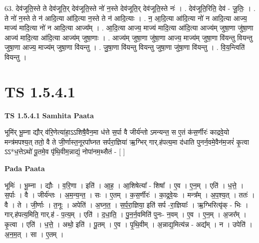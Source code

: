 \documentclass[17pt]{extarticle}
\begin{document}
63. देव॑जूति॒स्ते ते देव॑जूति॒र् देव॑जूति॒स्ते नो॑ न॒स्ते देव॑जूति॒र् देव॑जूति॒स्ते नः॑ । . देव॑जूति॒रिति॒ देव॑ - जू॒तिः॒ । . ते नो॑ न॒स्ते ते न॑ आदि॒त्या आ॑दि॒त्या न॒स्ते ते न॑ आदि॒त्याः । . न॒ आ॒दि॒त्या आ॑दि॒त्या नो॑ न आदि॒त्या आज्य॒ माज्य॑ मादि॒त्या नो॑ न आदि॒त्या आज्य᳚म् । . आ॒दि॒त्या आज्य॒ माज्य॑ मादि॒त्या आ॑दि॒त्या आज्य॑म् जुषा॒णा जु॑षा॒णा आज्य॑ मादि॒त्या आ॑दि॒त्या आज्य॑म् जुषा॒णाः । . आज्य॑म् जुषा॒णा जु॑षा॒णा आज्य॒ माज्य॑म् जुषा॒णा वि॑यन्तु वियन्तु जुषा॒णा आज्य॒ माज्य॑म् जुषा॒णा वि॑यन्तु । . जु॒षा॒णा वि॑यन्तु वियन्तु जुषा॒णा जु॑षा॒णा वि॑यन्तु । . वि॒य॒न्त्विति॑ वियन्तु । \newline
\pagebreak
{}

\section{ TS 1.5.4.1 }

\textbf{TS 1.5.4.1 } \newline
\textbf{Samhita Paata} \newline

भूमि॑र् भू॒म्ना द्यौर् व॑रि॒णेत्या॑हा॒ऽऽशिषै॒वैन॒मा ध॑त्ते स॒र्पा वै जीर्य॑न्तो ऽमन्यन्त॒ स ए॒तं क॑स॒र्णीरः॑ काद्रवे॒यो मन्त्र॑मपश्य॒त् ततो॒ वै ते जी॒र्णास्त॒नूरपा᳚घ्नत सर्परा॒ज्ञिया॑ ऋ॒ग्भिर् गार्.ह॑पत्य॒मा द॑धाति पुनर्न॒वमे॒वैन॑म॒जरं॑ कृ॒त्वा ऽऽ*ध॒त्तेऽथो॑ पू॒तमे॒व पृ॑थि॒वीम॒न्नाद्यं॒ नोपा॑नम॒थ्सैतं - [ ] \newline

\textbf{Pada Paata} \newline

भूमिः॑ । भू॒म्ना । द्यौः । व॒रि॒णा । इति॑ । आ॒ह॒ । आ॒शिषेत्या᳚ - शिषा᳚ । ए॒व । ए॒न॒म् । एति॑ । ध॒त्ते॒ । स॒र्पाः । वै । जीर्य॑न्तः । अ॒म॒न्य॒न्त॒ । सः । ए॒तम् । क॒स॒र्णीरः॑ । का॒द्र॒वे॒यः । मन्त्र᳚म् । अ॒प॒श्य॒त् । ततः॑ । वै । ते । जी॒र्णाः । त॒नूः । अपेति॑ । अ॒घ्न॒त॒ । स॒र्प॒रा॒ज्ञिया॒ इति॑ सर्प -रा॒ज्ञियाः᳚ । ऋ॒ग्भिरित्यृ॑क् - भिः । गार्.ह॑पत्य॒मिति॒ गार्.ह॑ - प॒त्य॒म् । एति॑ । द॒धा॒ति॒ । पु॒न॒र्न॒वमिति॑ पुनः- न॒वम् । ए॒व । ए॒न॒म् । अ॒जर᳚म् । कृ॒त्वा । एति॑ । ध॒त्ते॒ । अथो॒ इति॑ । पू॒तम् । ए॒व । पृ॒थि॒वीम् । अ॒न्नाद्य॒मित्य॑न्न - अद्य᳚म् । न । उपेति॑ । अ॒न॒म॒त् । सा । ए॒तम् ।  \newline
\end{document}
